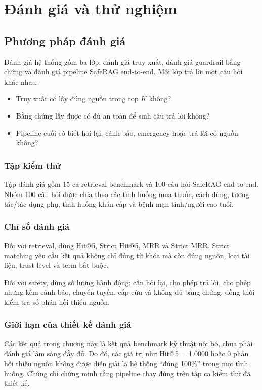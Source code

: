 \chapter{Đánh giá và thử nghiệm}

\section{Phương pháp đánh giá}

Đánh giá hệ thống gồm ba lớp: đánh giá truy xuất, đánh giá guardrail bằng chứng và đánh giá pipeline SafeRAG end-to-end. Mỗi lớp trả lời một câu hỏi khác nhau:

\begin{itemize}
  \item Truy xuất có lấy đúng nguồn trong top \(K\) không?
  \item Bằng chứng lấy được có đủ an toàn để sinh câu trả lời không?
  \item Pipeline cuối có biết hỏi lại, cảnh báo, emergency hoặc trả lời có nguồn không?
\end{itemize}

\subsection{Tập kiểm thử}

Tập đánh giá gồm 15 ca retrieval benchmark và 100 câu hỏi SafeRAG end-to-end. Nhóm 100 câu hỏi được chia theo các tình huống mua thuốc, cách dùng, tương tác/tác dụng phụ, tình huống khẩn cấp và bệnh mạn tính/người cao tuổi.

\subsection{Chỉ số đánh giá}

Đối với retrieval, dùng Hit@5, Strict Hit@5, MRR và Strict MRR. Strict matching yêu cầu kết quả không chỉ đúng từ khóa mà còn đúng nguồn, loại tài liệu, trust level và term bắt buộc.

Đối với safety, dùng số lượng hành động: cần hỏi lại, cho phép trả lời, cho phép nhưng kèm cảnh báo, chuyển tuyến, cấp cứu và không đủ bằng chứng; đồng thời kiểm tra số phản hồi thiếu nguồn.

\subsection{Giới hạn của thiết kế đánh giá}

Các kết quả trong chương này là kết quả benchmark kỹ thuật nội bộ, chưa phải đánh giá lâm sàng đầy đủ. Do đó, các giá trị như Hit@5 = 1.0000 hoặc 0 phản hồi thiếu nguồn không được diễn giải là hệ thống ``đúng 100\%'' trong mọi tình huống. Chúng chỉ chứng minh rằng pipeline chạy đúng trên tập ca kiểm thử đã thiết kế.

